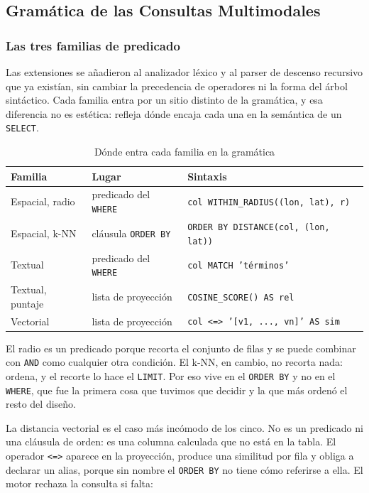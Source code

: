 \documentclass[a4paper,12pt]{article}
\begin{document}
\subsection{Gramática de las Consultas Multimodales}

\subsubsection{Las tres familias de predicado}

Las extensiones se añadieron al analizador léxico y al parser de descenso
recursivo que ya existían, sin cambiar la precedencia de operadores ni la forma
del árbol sintáctico. Cada familia entra por un sitio distinto de la gramática,
y esa diferencia no es estética: refleja dónde encaja cada una en la semántica
de un \texttt{SELECT}.

\begin{table}[H]
\centering
\caption{Dónde entra cada familia en la gramática}
\begin{tabularx}{\textwidth}{@{}llX@{}}
\toprule
\textbf{Familia} & \textbf{Lugar} & \textbf{Sintaxis} \\
\midrule
Espacial, radio & predicado del \texttt{WHERE} & \texttt{col WITHIN\_RADIUS((lon, lat), r)} \\
Espacial, k-NN & cláusula \texttt{ORDER BY} & \texttt{ORDER BY DISTANCE(col, (lon, lat))} \\
Textual & predicado del \texttt{WHERE} & \texttt{col MATCH 'términos'} \\
Textual, puntaje & lista de proyección & \texttt{COSINE\_SCORE() AS rel} \\
Vectorial & lista de proyección & \texttt{col \textless=\textgreater{} '[v1, ..., vn]' AS sim} \\
\bottomrule
\end{tabularx}
\end{table}

El radio es un predicado porque recorta el conjunto de filas y se puede combinar
con \texttt{AND} como cualquier otra condición. El k-NN, en cambio, no recorta
nada: ordena, y el recorte lo hace el \texttt{LIMIT}. Por eso vive en el
\texttt{ORDER BY} y no en el \texttt{WHERE}, que fue la primera cosa que tuvimos
que decidir y la que más ordenó el resto del diseño.

La distancia vectorial es el caso más incómodo de los cinco. No es un predicado
ni una cláusula de orden: es una columna calculada que no está en la tabla. El
operador \texttt{\textless=\textgreater{}} aparece en la proyección, produce una similitud por fila y
obliga a declarar un alias, porque sin nombre el \texttt{ORDER BY} no tiene cómo
referirse a ella. El motor rechaza la consulta si falta:
\end{document}
